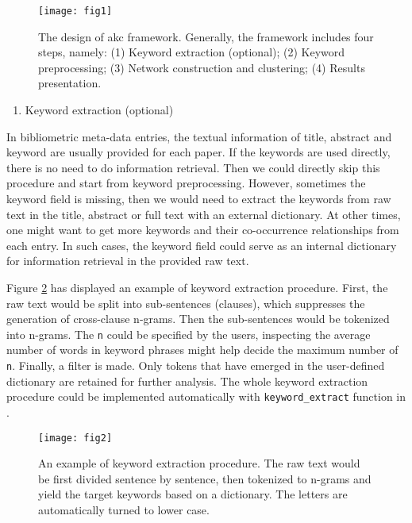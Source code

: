 \begin{figure}
\texttt{[image: fig1]} \caption{The design of akc framework. Generally, the framework includes four steps, namely: (1) Keyword extraction (optional); (2) Keyword preprocessing; (3)   Network construction and clustering; (4)    Results presentation.}\label{fig:fig1}
\end{figure}

\begin{enumerate}
\def\labelenumi{(\arabic{enumi})}
\tightlist
\item
  Keyword extraction (optional)
\end{enumerate}

In bibliometric meta-data entries, the textual information of title, abstract and keyword are usually provided for each paper. If the keywords are used directly, there is no need to do information retrieval. Then we could directly skip this procedure and start from keyword preprocessing. However, sometimes the keyword field is missing, then we would need to extract the keywords from raw text in the title, abstract or full text with an external dictionary. At other times, one might want to get more keywords and their co-occurrence relationships from each entry. In such cases, the keyword field could serve as an internal dictionary for information retrieval in the provided raw text.

Figure \ref{fig:fig2} has displayed an example of keyword extraction procedure. First, the raw text would be split into sub-sentences (clauses), which suppresses the generation of cross-clause n-grams. Then the sub-sentences would be tokenized into n-grams. The \texttt{n} could be specified by the users, inspecting the average number of words in keyword phrases might help decide the maximum number of \texttt{n}. Finally, a filter is made. Only tokens that have emerged in the user-defined dictionary are retained for further analysis. The whole keyword extraction procedure could be implemented automatically with \texttt{keyword\_extract} function in .

\begin{figure}
\texttt{[image: fig2]} \caption{An example of keyword extraction procedure. The raw text would be first divided sentence by sentence, then tokenized to n-grams and yield the target keywords based on a dictionary. The letters are automatically turned to lower case.}\label{fig:fig2}
\end{figure}

